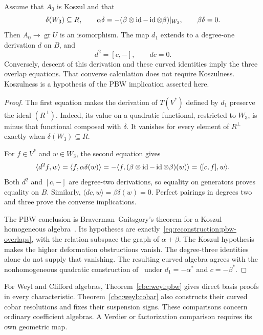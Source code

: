 \begin{theorem}\label{thm:curved-pbw}
Assume that $A_0$ is Koszul and that
\begin{equation}\label{eq:reconstruction:pbw-overlaps}
 \delta(W_3)\subseteq R,\qquad
 \alpha\delta=-(\beta\otimes\operatorname{id}-\operatorname{id}\otimes\beta)|_{W_3},\qquad
 \beta\delta=0.
\end{equation}
Then $A_0\to\operatorname{gr}U$ is an isomorphism.
The map $d_1$ extends to a degree-one derivation $d$ on $B$, and
\[
 d^2=[c,-],\qquad dc=0.
\]
Conversely, descent of this derivation and these curved identities imply the three overlap equations.
That converse calculation does not require Koszulness.
Koszulness is a hypothesis of the PBW implication asserted here.
\end{theorem}
\begin{proof}
The first equation makes the derivation of $T(V^*)$ defined by $d_1$ preserve the ideal $(R^\perp)$.
Indeed, its value on a quadratic functional, restricted to $W_3$, is minus that functional composed with $\delta$.
It vanishes for every element of $R^\perp$ exactly when $\delta(W_3)\subseteq R$.

For $f\in V^*$ and $w\in W_3$, the second equation gives
\[
 \langle d^2f,w\rangle
 =\langle f,\alpha\delta(w)\rangle
 =-\langle f,(\beta\otimes\operatorname{id}-\operatorname{id}\otimes\beta)(w)\rangle
 =\langle[c,f],w\rangle.
\]
Both $d^2$ and $[c,-]$ are degree-two derivations, so equality on generators proves equality on $B$.
Similarly, $\langle dc,w\rangle=\beta\delta(w)=0$.
Perfect pairings in degrees two and three prove the converse implications.

The PBW conclusion is Braverman--Gaitsgory's theorem for a Koszul homogeneous algebra~\cite[Theorem~4.1 and Lemma~3.3]{BG1994PBW}.
Its hypotheses are exactly~\eqref{eq:reconstruction:pbw-overlaps}, with the relation subspace the graph of $\alpha+\beta$.
The Koszul hypothesis makes the higher deformation obstructions vanish.
The degree-three identities alone do not supply that vanishing.
The resulting curved algebra agrees with the nonhomogeneous quadratic construction of~\cite[Proposition~2.2]{PositselskiCurvature2014} under $d_1=-\alpha^*$ and $c=-\beta^*$.
\end{proof}

For Weyl and Clifford algebras, Theorem~\ref{cbc:weyl:pbw} gives direct basis proofs in every characteristic.
Theorem~\ref{cbc:weyl:cobar} also constructs their curved cobar resolutions and fixes their suspension signs.
These comparisons concern ordinary coefficient algebras.
A Verdier or factorization comparison requires its own geometric map.

